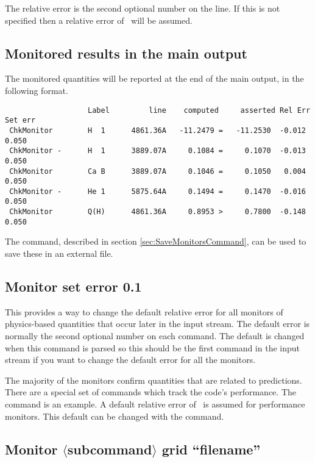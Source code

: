 The relative error is the second optional number on the line.
If this
is not specified then a relative error of \ErrorDefault\ will be assumed.

\subsection{Monitored results in the main output}

The monitored quantities will be reported at the end of the main output, in the following format.
\begin{verbatim}
                   Label         line    computed     asserted Rel Err Set err
 ChkMonitor        H  1      4861.36A   -11.2479 =   -11.2530  -0.012   0.050
 ChkMonitor -      H  1      3889.07A     0.1084 =     0.1070  -0.013   0.050
 ChkMonitor        Ca B      3889.07A     0.1046 =     0.1050   0.004   0.050
 ChkMonitor -      He 1      5875.64A     0.1494 =     0.1470  -0.016   0.050
 ChkMonitor        Q(H)      4861.36A     0.8953 >     0.7800  -0.148   0.050
\end{verbatim}
The  command, described in section \ref{sec:SaveMonitorsCommand},
can be used to save these in an external file.
 
\subsection{Monitor set error 0.1}

This provides a way to change the default relative error for all monitors
of physics-based quantities that occur later in the input stream.
The default error is normally the second optional number on each
 command.
The default is changed when this command is parsed so this should
be the first  command in the input stream if
you want to change the default error for all the monitors.

The majority of the monitors confirm quantities that are related to
predictions.
There are a special set of  commands which
track the code's performance.  
The  command is an example.
A default relative error of \ErrorDefaultPerformance\ is assumed for
performance monitors.
This default can be changed with the
 command.

\subsection{Monitor $\langle$subcommand$\rangle$ grid ``filename''}


